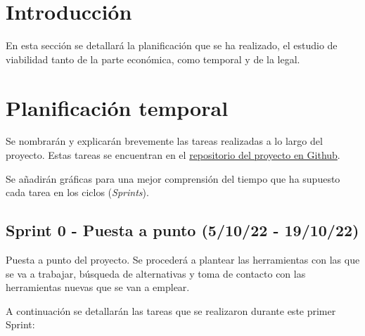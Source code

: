 
\section{Introducción}
En esta sección se detallará la planificación que se ha realizado, el estudio de viabilidad tanto de la parte económica, como temporal y de la legal. 
\section{Planificación temporal}
Se nombrarán y explicarán brevemente las tareas realizadas a lo largo del proyecto. Estas tareas se encuentran en el \href{https://github.com/drg1006/Gestor-TFG-2022}{repositorio del proyecto en Github}. 

Se añadirán gráficas para una mejor comprensión del tiempo que ha supuesto cada tarea en los ciclos (\emph{Sprints}). 

\subsection{Sprint 0 - Puesta a punto (5/10/22 - 19/10/22)}
Puesta a punto del proyecto.
Se procederá a plantear las herramientas con las que se va a trabajar, búsqueda de alternativas y toma de contacto con las herramientas nuevas que se van a emplear.

A continuación se detallarán las tareas que se realizaron durante este primer Sprint:

